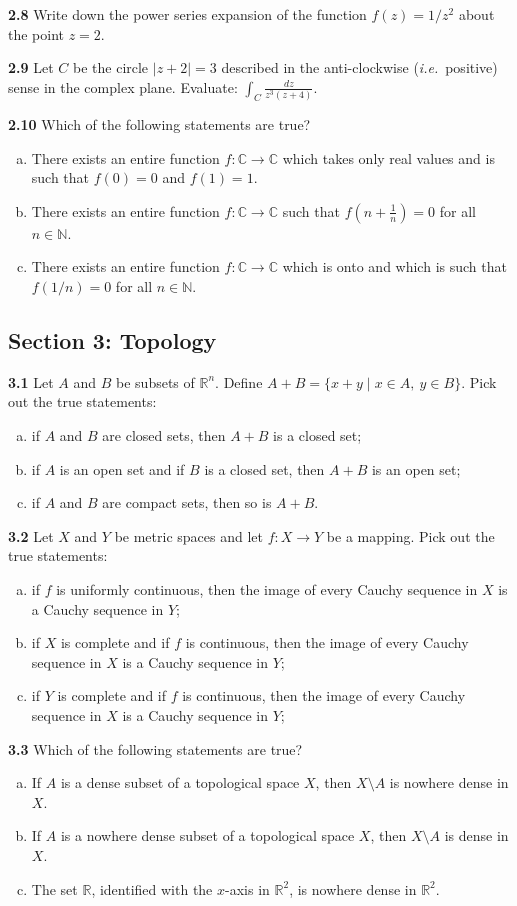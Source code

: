 \documentclass[11pt,a4paper]{article}
\newcommand{\N}{\mathbb{N}}
\newcommand{\R}{\mathbb{R}}
\newcommand{\C}{\mathbb{C}}
\newcommand{\examsec}[1]{%
  \subsection*{#1}
  \vspace{-2pt}
}
\newcommand{\qitem}[1]{\par\medskip\noindent\textbf{#1}\hspace{0.5em}}
\begin{document}
\qitem{2.8} Write down the power series expansion of the function $f(z) = 1/z^2$ about the point $z = 2$.

\qitem{2.9} Let $C$ be the circle $|z + 2| = 3$ described in the anti-clockwise (\emph{i.e.}\ positive) sense in the complex plane. Evaluate: $\displaystyle\int_C \frac{dz}{z^3(z+4)}$.

\qitem{2.10} Which of the following statements are true?
\begin{enumerate}[a.]
  \item There exists an entire function $f : \C \to \C$ which takes only real values and is such that $f(0) = 0$ and $f(1) = 1$.
  \item There exists an entire function $f : \C \to \C$ such that $f\left(n + \frac{1}{n}\right) = 0$ for all $n \in \N$.
  \item There exists an entire function $f : \C \to \C$ which is onto and which is such that $f(1/n) = 0$ for all $n \in \N$.
\end{enumerate}

\examsec{Section 3: Topology}

\qitem{3.1} Let $A$ and $B$ be subsets of $\R^n$. Define $A + B = \{x + y \mid x \in A,\ y \in B\}$. Pick out the true statements:
\begin{enumerate}[a.]
  \item if $A$ and $B$ are closed sets, then $A + B$ is a closed set;
  \item if $A$ is an open set and if $B$ is a closed set, then $A + B$ is an open set;
  \item if $A$ and $B$ are compact sets, then so is $A + B$.
\end{enumerate}

\qitem{3.2} Let $X$ and $Y$ be metric spaces and let $f : X \to Y$ be a mapping. Pick out the true statements:
\begin{enumerate}[a.]
  \item if $f$ is uniformly continuous, then the image of every Cauchy sequence in $X$ is a Cauchy sequence in $Y$;
  \item if $X$ is complete and if $f$ is continuous, then the image of every Cauchy sequence in $X$ is a Cauchy sequence in $Y$;
  \item if $Y$ is complete and if $f$ is continuous, then the image of every Cauchy sequence in $X$ is a Cauchy sequence in $Y$;
\end{enumerate}

\qitem{3.3} Which of the following statements are true?
\begin{enumerate}[a.]
  \item If $A$ is a dense subset of a topological space $X$, then $X \setminus A$ is nowhere dense in $X$.
  \item If $A$ is a nowhere dense subset of a topological space $X$, then $X \setminus A$ is dense in $X$.
  \item The set $\R$, identified with the $x$-axis in $\R^2$, is nowhere dense in $\R^2$.
\end{enumerate}
\end{document}
